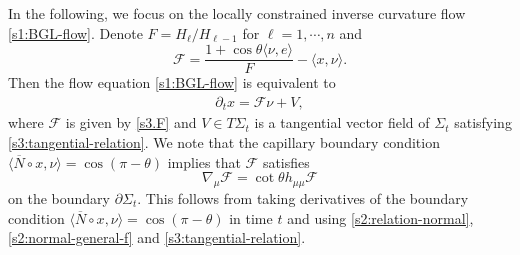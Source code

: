 \documentclass[11pt,reqno]{amsart}
\theoremstyle{definition}
\theoremstyle{remark}
\numberwithin{equation}{section}
\renewcommand{\(}{\left(}
\renewcommand{\)}{\right)}
\renewcommand{\-}{\overline}
\renewcommand{\t}{\theta}
\begin{document}
In the following,  we focus on the locally constrained inverse curvature flow \eqref{s1:BGL-flow}. Denote $F=H_{\ell}/H_{\ell-1}$ for $\ell=1,\cdots,n$ and
\begin{equation}\label{s3.F}
\mathcal{F}=\frac{1+\cos\t\langle \nu,e\rangle}{F}-\langle x,\nu\rangle.
\end{equation}
Then the flow equation \eqref{s1:BGL-flow} is equivalent to
\begin{align}\label{s2:BGL-flow}
\partial_tx=\mathcal{F}\nu+V,
\end{align}
where $\mathcal{F}$ is given by \eqref{s3.F} and $V\in T\Sigma_t$ is a tangential vector field of $\Sigma_t$ satisfying \eqref{s3:tangential-relation}. We note that the capillary boundary condition $\langle \overline{N}\circ x, \nu\rangle =\cos(\pi-\theta)$ implies that $\mathcal{F}$ satisfies
\begin{equation}\label{s3:DF}
  \nabla_\mu \mathcal{F}=\cot\theta h_{\mu\mu}\mathcal{F}
\end{equation}
on the boundary $\partial\Sigma_t$. This follows from taking derivatives of the boundary condition $\langle \overline{N}\circ x, \nu\rangle =\cos(\pi-\theta)$ in time $t$ and using \eqref{s2:relation-normal}, \eqref{s2:normal-general-f} and \eqref{s3:tangential-relation}.
\end{document}
